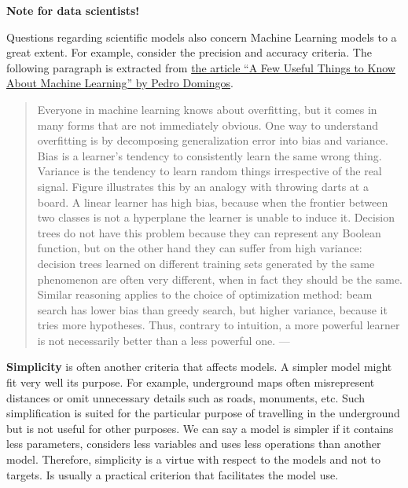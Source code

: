 \documentclass[
]{book}
\begin{document}
\begin{tipbox}

\textbf{Note for data scientists!}

Questions regarding scientific models also concern Machine Learning models to a great extent. For example, consider the precision and accuracy criteria. The following paragraph is extracted from \href{https://dl.acm.org/doi/pdf/10.1145/2347736.2347755}{the article ``A Few Useful Things to Know About Machine Learning'' by Pedro Domingos}.

\begin{quote}
Everyone in machine learning knows about overfitting, but it comes in many forms that are not immediately obvious. One way to understand overfitting is by decomposing generalization error into bias and variance. Bias is a learner's tendency to consistently learn the same wrong thing. Variance is the tendency to learn random things irrespective of the real signal. Figure illustrates this by an analogy with throwing darts at a board. A linear learner has high bias, because when the frontier between two classes is not a hyperplane the learner is unable to induce it. Decision trees do not have this problem because they can represent any Boolean function, but on the other hand they can suffer from high variance: decision trees learned on different training sets generated by the same phenomenon are often very different, when in fact they should be the same. Similar reasoning applies to the choice of optimization method: beam search has lower bias than greedy search, but higher variance, because it tries more hypotheses. Thus, contrary to intuition, a more powerful learner is not necessarily better than a less powerful one. --- \citep{domingos2012few}
\end{quote}

\end{tipbox}

\textbf{Simplicity} is often another criteria that affects models. A simpler model might fit very well its purpose. For example, underground maps often misrepresent distances or omit unnecessary details such as roads, monuments, etc. Such simplification is suited for the particular purpose of travelling in the underground but is not useful for other purposes. We can say a model is simpler if it contains less parameters, considers less variables and uses less operations than another model. Therefore, simplicity is a virtue with respect to the models and not to targets. Is usually a practical criterion that facilitates the model use.
\end{document}
